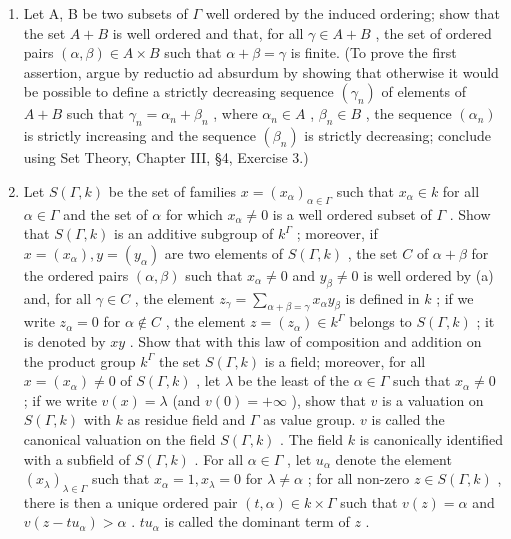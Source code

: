 \begin{enumerate}
\def\labelenumi{(\alph{enumi})}
\item
  Let A, B be two subsets of \(\Gamma\) well ordered by the induced ordering; show that the set \(A + B\) is well ordered and that, for all \(\gamma \in A + B\) , the set of ordered pairs \((\alpha, \beta) \in A \times B\) such that \(\alpha + \beta = \gamma\) is finite. (To prove the first assertion, argue by reductio ad absurdum by showing that otherwise it would be possible to define a strictly decreasing sequence \((\gamma_n)\) of elements of \(A + B\) such that \(\gamma_n = \alpha_n + \beta_n\) , where \(\alpha_n \in A\) , \(\beta_n \in B\) , the sequence \((\alpha_n)\) is strictly increasing and the sequence \((\beta_n)\) is strictly decreasing; conclude using Set Theory, Chapter III, §4, Exercise 3.)
\item
  Let \(S(\Gamma, k)\) be the set of families \(x = (x_{\alpha})_{\alpha \in \Gamma}\) such that \(x_{\alpha} \in k\) for all \(\alpha \in \Gamma\) and the set of \(\alpha\) for which \(x_{\alpha} \neq 0\) is a well ordered subset of \(\Gamma\) . Show that \(S(\Gamma, k)\) is an additive subgroup of \(k^{\Gamma}\) ; moreover, if \(x = (x_{\alpha}), y = (y_{\alpha})\) are two elements of \(S(\Gamma, k)\) , the set \(C\) of \(\alpha + \beta\) for the ordered pairs \((\alpha, \beta)\) such that \(x_{\alpha} \neq 0\) and \(y_{\beta} \neq 0\) is well ordered by (a) and, for all \(\gamma \in C\) , the element \(z_{\gamma} = \sum_{\alpha + \beta = \gamma} x_{\alpha} y_{\beta}\) is defined in \(k\) ; if we write \(z_{\alpha} = 0\) for \(\alpha \notin C\) , the element \(z = (z_{\alpha}) \in k^{\Gamma}\) belongs to \(S(\Gamma, k)\) ; it is denoted by \(xy\) . Show that with this law of composition and addition on the product group \(k^{\Gamma}\) the set \(S(\Gamma, k)\) is a field; moreover, for all \(x = (x_{\alpha}) \neq 0\) of \(S(\Gamma, k)\) , let \(\lambda\) be the least of the \(\alpha \in \Gamma\) such that \(x_{\alpha} \neq 0\) ; if we write \(v(x) = \lambda\) (and \(v(0) = +\infty\) ), show that \(v\) is a valuation on \(S(\Gamma, k)\) with \(k\) as residue field and \(\Gamma\) as value group. \(v\) is called the canonical valuation on the field \(S(\Gamma, k)\) . The field \(k\) is canonically identified with a subfield of \(S(\Gamma, k)\) . For all \(\alpha \in \Gamma\) , let \(u_{\alpha}\) denote the element \((x_{\lambda})_{\lambda \in \Gamma}\) such that \(x_{\alpha} = 1, x_{\lambda} = 0\) for \(\lambda \neq \alpha\) ; for all non-zero \(z \in S(\Gamma, k)\) , there is then a unique ordered pair \((t, \alpha) \in k \times \Gamma\) such that \(v(z) = \alpha\) and \(v(z - tu_{\alpha}) > \alpha\) . \(tu_{\alpha}\) is called the dominant term of \(z\) .
\end{enumerate}

